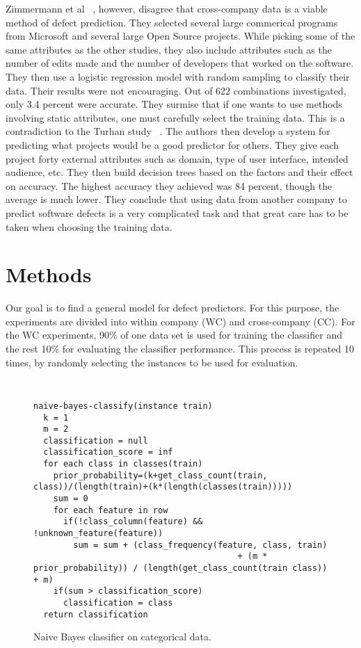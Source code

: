 \documentclass{sig-alternate}
\begin{document}
Zimmermann et al ~\cite{Zimmermann2009}, however, disagree that cross-company data is a viable method of defect prediction.  They selected several large commerical programs from Microsoft and several large Open Source projects.  While picking some of the same attributes as the other studies, they also include attributes such as the number of edits made and the number of developers that worked on the software.  They then use a logistic regression model with random sampling to classify their data.  Their results were not encouraging.  Out of 622 combinations investigated, only 3.4 percent were accurate.  They surmise that if one wants to use methods involving static attributes, one must carefully select the training data.  This is a contradiction to the Turhan study ~\cite{Turhan2009}.  The authors then develop a system for predicting what projects would be a good predictor for others.  They give each project forty external attributes such as domain, type of user interface, intended audience, etc.  They then build decision trees based on the factors and their effect on accuracy.  The highest accuracy they achieved was 84 percent, though the average is much lower.  They conclude that using data from another company to predict software defects is a very complicated task and that great care has to be taken when choosing the training data.

\section{Methods}
Our goal is to find a general model for defect predictors. For this purpose, the experiments are divided
into  within company (WC) and cross-company (CC). For the WC experiments, 90\% of one data set
is used for training the classifier and the rest 10\% for evaluating the classifier performance. This process
is repeated 10 times, by randomly selecting the instances to be used for evaluation.
\begin{figure*}[tbp]
\makebox[\linewidth]{\hrulefill}
{\tt\small
\begin{verbatim}
naive-bayes-classify(instance train)
  k = 1
  m = 2
  classification = null
  classification_score = inf
  for each class in classes(train)
    prior_probability=(k+get_class_count(train, class))/(length(train)+(k*(length(classes(train)))))
    sum = 0
    for each feature in row
      if(!class_column(feature) && !unknown_feature(feature))
        sum = sum + (class_frequency(feature, class, train)
        						         + (m * prior_probability)) / (length(get_class_count(train class)) + m)
    if(sum > classification_score)
      classification = class
  return classification
\end{verbatim}}
\makebox[\linewidth]{\hrulefill}
\caption{Naive Bayes classifier on categorical data.}
\label{fig:naiveBayes}
\end{figure*}
\end{document}
